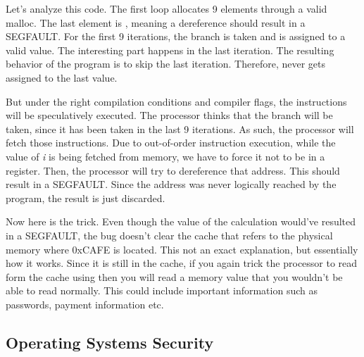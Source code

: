 Let's analyze this code.
The first loop allocates 9 elements through a valid malloc.
The last element is , meaning a dereference should result in a SEGFAULT.
For the first 9 iterations, the branch is taken and  is assigned to a valid value.
The interesting part happens in the last iteration.
The resulting behavior of the program is to skip the last iteration.
Therefore,  never gets assigned to the last value.

But under the right compilation conditions and compiler flags, the instructions will be speculatively executed.
The processor thinks that the branch will be taken, since it has been taken in the last 9 iterations.
As such, the processor will fetch those instructions.
Due to out-of-order instruction execution, while the value of \emph{i} is being fetched from memory, we have to force it not to be in a register.
Then, the processor will try to dereference that address.
This should result in a SEGFAULT.
Since the address was never logically reached by the program, the result is just discarded.

Now here is the trick.
Even though the value of the calculation would've resulted in a SEGFAULT, the bug doesn't clear the cache that refers to the physical memory where 0xCAFE is located. This not an exact explanation, but essentially how it works.
Since it is still in the cache, if you again trick the processor to read form the cache using  then you will read a memory value that you wouldn't be able to read normally.
This could include important information such as passwords, payment information etc.

\subsection{Operating Systems Security}


